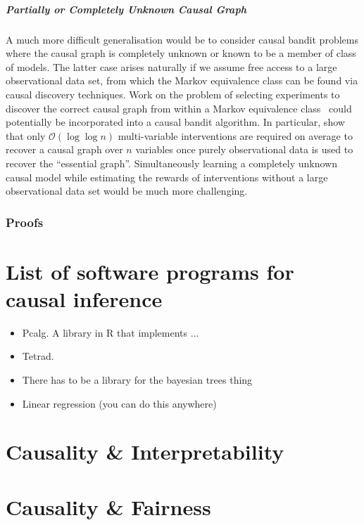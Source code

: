 \documentclass[11pt,a4paper,oneside]{book}
\newcommand{\bigo}[1]{\mathcal{O}\left( #1 \right)}
\theoremstyle{plain}
\theoremstyle{definition}
\begin{document}
\paragraph{Partially or Completely Unknown Causal Graph}
A much more difficult generalisation would be to consider causal bandit problems where the causal graph is completely unknown or known to be a member of class of models.
The latter case arises naturally if we assume free access to a large observational data set, from which the Markov equivalence class can be found via causal discovery techniques. 
Work on the problem of selecting experiments to discover the correct causal graph from within a Markov equivalence class~\cite{Eberhardt2005,eberhardt2010causal,hauser2014two,Hu2014b} could potentially be incorporated into a causal bandit algorithm.
In particular, \citet{Hu2014b} show that only $\bigo{\log \log n}$ multi-variable interventions are required on average to recover a causal graph over $n$ variables once purely observational data is used to recover the ``essential graph''.
Simultaneously learning a completely unknown causal model while estimating the rewards of interventions without a large observational data set would be much more challenging.

\subsection{Proofs}

\chapter{List of software programs for causal inference}

\begin{itemize}
\item Pcalg. A library in R that implements ...
\item Tetrad.
\item There has to be a library for the bayesian trees thing
\item Linear regression (you can do this anywhere)

\end{itemize}

\chapter{Causality \& Interpretability}

\chapter{Causality \& Fairness}
\end{document}
